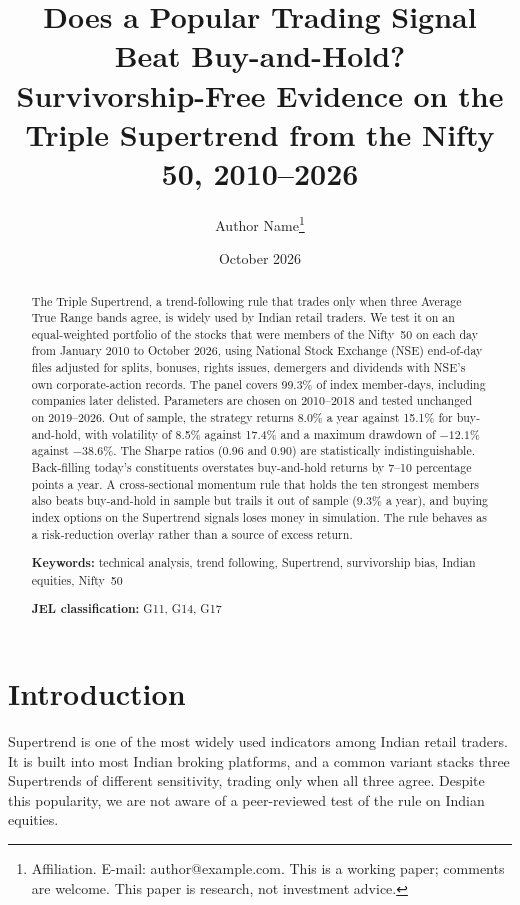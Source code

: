 \documentclass[11pt]{article}
\title{Does a Popular Trading Signal Beat Buy-and-Hold?\\
\large Survivorship-Free Evidence on the Triple Supertrend from the Nifty 50, 2010--2026}
\author{Author Name\thanks{Affiliation. E-mail: author@example.com.
This is a working paper; comments are welcome. This paper is research, not investment advice.}}
\date{October 2026}
\begin{document}
\maketitle

\begin{abstract}
\noindent
The Triple Supertrend, a trend-following rule that trades only when three Average True Range bands agree, is
widely used by Indian retail traders. We test it on an equal-weighted portfolio of the stocks that were
members of the Nifty~50 on each day from January 2010 to October 2026, using National Stock Exchange (NSE)
end-of-day files adjusted for splits, bonuses, rights issues, demergers and dividends with NSE's own
corporate-action records. The panel covers 99.3\% of index member-days, including companies later delisted.
Parameters are chosen on 2010--2018 and tested unchanged on 2019--2026. Out of sample, the strategy returns
8.0\% a year against 15.1\% for buy-and-hold, with volatility of 8.5\% against 17.4\% and a maximum drawdown of
$-12.1\%$ against $-38.6\%$. The Sharpe ratios (0.96 and 0.90) are statistically indistinguishable. Back-filling
today's constituents overstates buy-and-hold returns by 7--10 percentage points a year. A cross-sectional
momentum rule that holds the ten strongest members also beats buy-and-hold in sample but trails it out of sample
(9.3\% a year), and buying index options on the Supertrend signals loses money in simulation. The rule behaves as a risk-reduction overlay rather than a source
of excess return.

\medskip
\noindent\textbf{Keywords:} technical analysis, trend following, Supertrend, survivorship bias, Indian equities,
Nifty~50

\noindent\textbf{JEL classification:} G11, G14, G17
\end{abstract}

\newpage

\section{Introduction}

Supertrend is one of the most widely used indicators among Indian retail traders. It is built into most Indian
broking platforms, and a common variant stacks three Supertrends of different sensitivity, trading only when all
three agree. Despite this popularity, we are not aware of a peer-reviewed test of the rule on Indian equities.
\end{document}
